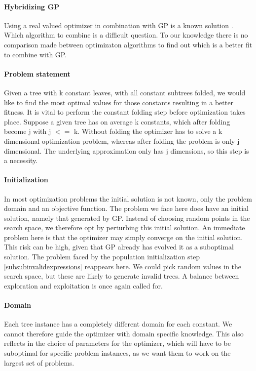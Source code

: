 \paragraph{Hybridizing GP}
Using a real valued optimizer in combination with GP is a known solution \cite{GEDE, GPConst}.
Which algorithm to combine is a difficult question. To our knowledge there is no comparison made between optimizaton algorithms to find out which is a better fit to combine with GP. 

\paragraph{Problem statement}
Given a tree with k constant leaves, with all constant subtrees folded, we would like to find the most optimal values for those constants resulting in a better fitness. 
It is vital to perform the constant folding step before optimization takes place. Suppose a given tree has on average k constants, which after folding become j with j $<=$ k. Without folding the optimizer has to solve a k dimensional optimization problem, whereas after folding the problem is only j dimensional. The underlying approximation only has j dimensions, so this step is a necessity.

\paragraph{Initialization}
In most optimization problems the initial solution is not known, only the problem domain and an objective function. The problem we face here does have an initial solution, namely that generated by GP. Instead of choosing random points in the search space, we therefore opt by perturbing this initial solution. An immediate problem here is that the optimizer may simply converge on the initial solution. This risk can be high, given that GP already has evolved it as a suboptimal solution. 
The problem faced by the population initialization step \ref{subsubinvalidexpressions} reappears here. We could pick random values in the search space, but these are likely to generate invalid trees. A balance between exploration and exploitation is once again called for.

\paragraph{Domain}
Each tree instance has a completely different domain for each constant. We cannot therefore guide the optimizer with domain specific knowledge. This also reflects in the choice of parameters for the optimizer, which will have to be suboptimal for specific problem instances, as we want them to work on the largest set of problems.


